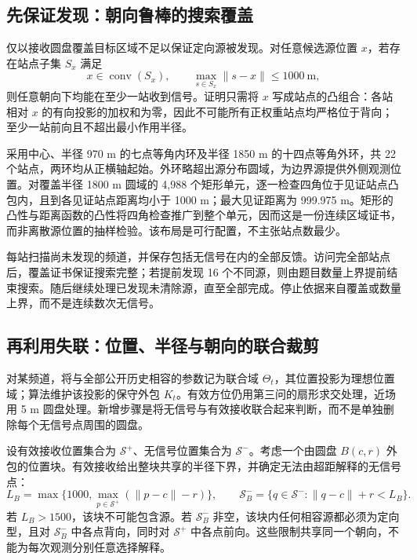 \subsection{先保证发现：朝向鲁棒的搜索覆盖}

仅以接收圆盘覆盖目标区域不足以保证定向源被发现。对任意候选源位置 $x$，若存在站点子集 $S_x$ 满足
\begin{equation}
 x\in\operatorname{conv}(S_x),\qquad
 \max_{s\in S_x}\|s-x\|\le1000\ \mathrm m,
 \label{eq:q4r-cover}
\end{equation}
则任意朝向下均能在至少一站收到信号。证明只需将 $x$ 写成站点的凸组合：各站相对 $x$ 的有向投影的加权和为零，因此不可能所有正权重站点均严格位于背向；至少一站前向且不超出最小作用半径。

采用中心、半径 970 m 的七点等角内环及半径 1850 m 的十四点等角外环，共 22 个站点，两环均从正横轴起始。外环略超出源分布圆域，为边界源提供外侧观测位置。对覆盖半径 1800 m 圆域的 4,988 个矩形单元，逐一检查四角位于见证站点凸包内，且到各见证站点距离均小于 1000 m；最大见证距离为 999.975 m。矩形的凸性与距离函数的凸性将四角检查推广到整个单元，因而这是一份连续区域证书，而非离散源位置的抽样检验。该布局是可行配置，不主张站点数最少。

每站扫描尚未发现的频道，并保存包括无信号在内的全部反馈。访问完全部站点后，覆盖证书保证搜索完整；若提前发现 16 个不同源，则由题目数量上界提前结束搜索。随后继续处理已发现未清除源，直至全部完成。停止依据来自覆盖或数量上界，而不是连续数次无信号。

\subsection{再利用失联：位置、半径与朝向的联合裁剪}

对某频道，将与全部公开历史相容的参数记为联合域 $\Theta_t$，其位置投影为理想位置域；算法维护该投影的保守外包 $K_t$。有效方位仍用第三问的扇形求交处理，近场用 5 m 圆盘处理。新增步骤是将无信号与有效接收联合起来判断，而不是单独删除每个无信号点周围的圆盘。

设有效接收位置集合为 $\mathcal S^+$、无信号位置集合为 $\mathcal S^-$。考虑一个由圆盘 $B(c,r)$ 外包的位置块。有效接收给出整块共享的半径下界，并确定无法由超距解释的无信号点：
\begin{equation}
 L_B=\max\{1000,\max_{p\in\mathcal S^+}(\|p-c\|-r)\},\qquad
 \mathcal S^-_B=\{q\in\mathcal S^-:\|q-c\|+r<L_B\}.
 \label{eq:q4r-forced}
\end{equation}
若 $L_B>1500$，该块不可能包含源。若 $\mathcal S^-_B$ 非空，该块内任何相容源都必须为定向型，且对 $\mathcal S^-_B$ 中各点背向，同时对 $\mathcal S^+$ 中各点前向。这些限制共享同一个朝向，不能为每次观测分别任意选择解释。

